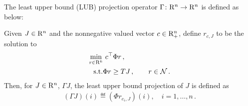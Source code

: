 The least upper bound (LUB) projection operator $\Gamma \colon \mathrm{R}^n \rightarrow\mathrm{R}^n$ is defined as below:
\begin{definition}\label{lubpop}
Given $J\in \mathrm{R}^n$ and the nonnegative valued vector $c\in \mathrm{R}^n_+$, define $r_{c,J}$ to be the solution to 
\begin{align}
\label{lubplp}
\begin{split}
 \underset{r\in \R^k}{\min} &\,\, c^\top \Phi r\,,\\
 \text{s.t.}& \mb \Phi r\geq  TJ\,, \qquad r\in \N\,.
 \end{split}
\end{align}
Then, for $J\in \mathrm{R}^n$, $\Gamma J$,
the least upper bound projection of $J$ is defined as 
\begin{align}\label{gamdef}
(\Gamma J)(i)\eqdef(\Phi r_{e_i,J})(i),\quad i=1,\ldots,n\,.
\end{align}
\end{definition}
